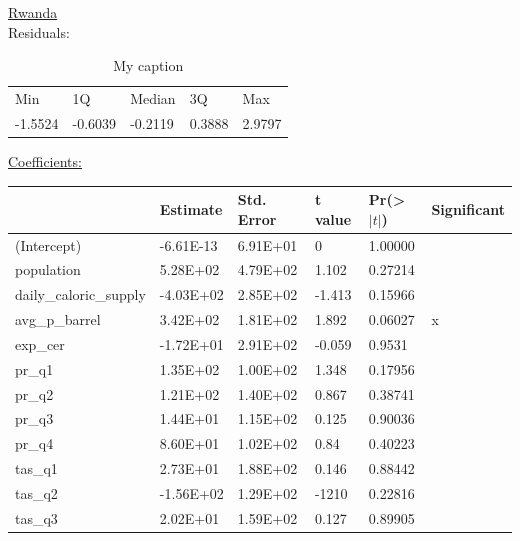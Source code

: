\documentclass[12pt,a4paper,english]{article}
\begin{document}
\underline{Rwanda} \\
Residuals:
\FloatBarrier
\begin{table}[!htbp]
\centering
\begin{tabular}{lllll}
Min     & 1Q      & Median  & 3Q     & Max    \\
-1.5524 & -0.6039 & -0.2119 & 0.3888 & 2.9797
\end{tabular}
\caption{My caption}
\label{my-label}
\end{table}
\FloatBarrier

\underline{Coefficients:} \\

\FloatBarrier
\begin{table}[!htbp]
\centering
\begin{tabular}{llllll}
\hline
                       & Estimate  & Std. Error & t value & Pr(\textgreater$|t|$) & Significant \\ \hline
(Intercept)            & -6.61E-13 & 6.91E+01   & 0       & 1.00000             &             \\
population             & 5.28E+02  & 4.79E+02   & 1.102   & 0.27214             &             \\
daily\_caloric\_supply & -4.03E+02 & 2.85E+02   & -1.413  & 0.15966             &             \\
avg\_p\_barrel         & 3.42E+02  & 1.81E+02   & 1.892   & 0.06027             & x           \\
exp\_cer               & -1.72E+01 & 2.91E+02   & -0.059  & 0.9531              &             \\
pr\_q1                 & 1.35E+02  & 1.00E+02   & 1.348   & 0.17956             &             \\
pr\_q2                 & 1.21E+02  & 1.40E+02   & 0.867   & 0.38741             &             \\
pr\_q3                 & 1.44E+01  & 1.15E+02   & 0.125   & 0.90036             &             \\
pr\_q4                 & 8.60E+01  & 1.02E+02   & 0.84    & 0.40223             &             \\
tas\_q1                & 2.73E+01  & 1.88E+02   & 0.146   & 0.88442             &             \\
tas\_q2                & -1.56E+02 & 1.29E+02   & -1210   & 0.22816             &             \\
tas\_q3                & 2.02E+01  & 1.59E+02   & 0.127   & 0.89905             &             \\

\end{tabular}
\end{table}
\end{document}
